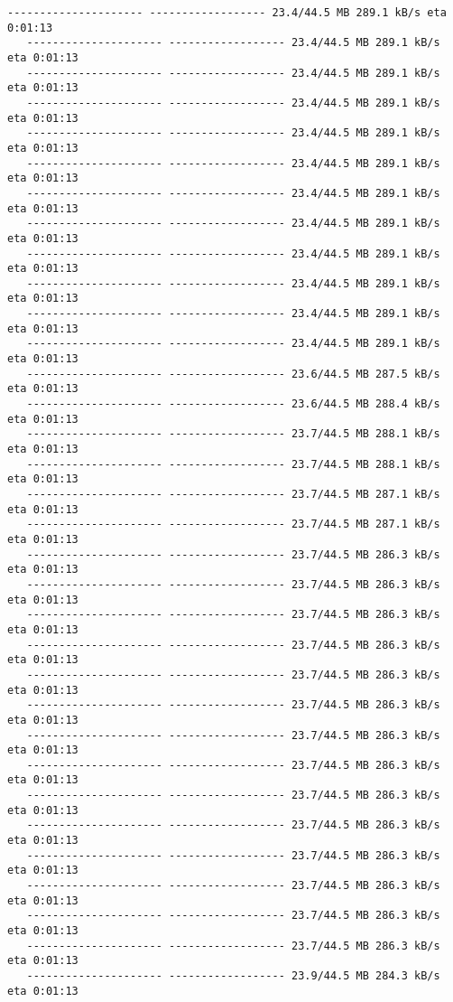 \documentclass[11pt]{article}
\begin{document}
\begin{Verbatim}[commandchars=\\\{\}]
   --------------------- ------------------ 23.4/44.5 MB 289.1 kB/s eta 0:01:13
   --------------------- ------------------ 23.4/44.5 MB 289.1 kB/s eta 0:01:13
   --------------------- ------------------ 23.4/44.5 MB 289.1 kB/s eta 0:01:13
   --------------------- ------------------ 23.4/44.5 MB 289.1 kB/s eta 0:01:13
   --------------------- ------------------ 23.4/44.5 MB 289.1 kB/s eta 0:01:13
   --------------------- ------------------ 23.4/44.5 MB 289.1 kB/s eta 0:01:13
   --------------------- ------------------ 23.4/44.5 MB 289.1 kB/s eta 0:01:13
   --------------------- ------------------ 23.4/44.5 MB 289.1 kB/s eta 0:01:13
   --------------------- ------------------ 23.4/44.5 MB 289.1 kB/s eta 0:01:13
   --------------------- ------------------ 23.4/44.5 MB 289.1 kB/s eta 0:01:13
   --------------------- ------------------ 23.4/44.5 MB 289.1 kB/s eta 0:01:13
   --------------------- ------------------ 23.4/44.5 MB 289.1 kB/s eta 0:01:13
   --------------------- ------------------ 23.6/44.5 MB 287.5 kB/s eta 0:01:13
   --------------------- ------------------ 23.6/44.5 MB 288.4 kB/s eta 0:01:13
   --------------------- ------------------ 23.7/44.5 MB 288.1 kB/s eta 0:01:13
   --------------------- ------------------ 23.7/44.5 MB 288.1 kB/s eta 0:01:13
   --------------------- ------------------ 23.7/44.5 MB 287.1 kB/s eta 0:01:13
   --------------------- ------------------ 23.7/44.5 MB 287.1 kB/s eta 0:01:13
   --------------------- ------------------ 23.7/44.5 MB 286.3 kB/s eta 0:01:13
   --------------------- ------------------ 23.7/44.5 MB 286.3 kB/s eta 0:01:13
   --------------------- ------------------ 23.7/44.5 MB 286.3 kB/s eta 0:01:13
   --------------------- ------------------ 23.7/44.5 MB 286.3 kB/s eta 0:01:13
   --------------------- ------------------ 23.7/44.5 MB 286.3 kB/s eta 0:01:13
   --------------------- ------------------ 23.7/44.5 MB 286.3 kB/s eta 0:01:13
   --------------------- ------------------ 23.7/44.5 MB 286.3 kB/s eta 0:01:13
   --------------------- ------------------ 23.7/44.5 MB 286.3 kB/s eta 0:01:13
   --------------------- ------------------ 23.7/44.5 MB 286.3 kB/s eta 0:01:13
   --------------------- ------------------ 23.7/44.5 MB 286.3 kB/s eta 0:01:13
   --------------------- ------------------ 23.7/44.5 MB 286.3 kB/s eta 0:01:13
   --------------------- ------------------ 23.7/44.5 MB 286.3 kB/s eta 0:01:13
   --------------------- ------------------ 23.7/44.5 MB 286.3 kB/s eta 0:01:13
   --------------------- ------------------ 23.7/44.5 MB 286.3 kB/s eta 0:01:13
   --------------------- ------------------ 23.9/44.5 MB 284.3 kB/s eta 0:01:13

\end{Verbatim}
\end{document}
